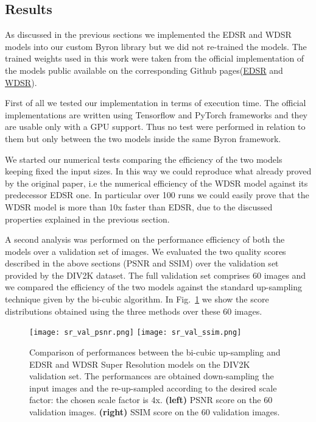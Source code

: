 \documentclass{standalone}
\begin{document}
\subsection[Results]{Results}\label{SR:results}

As discussed in the previous sections we implemented the EDSR and WDSR models into our custom \textsf{Byron} library but we did not re-trained the models.
The trained weights used in this work were taken from the official implementation of the models public available on the corresponding Github pages(\href{}{EDSR} and \href{}{WDSR}). %

First of all we tested our implementation in terms of execution time.
The official implementations are written using \textsf{Tensorflow} and \textsf{PyTorch} frameworks and they are usable only with a GPU support.
Thus no test were performed in relation to them but only between the two models inside the same \textsf{Byron} framework.

We started our numerical tests comparing the efficiency of the two models keeping fixed the input sizes.
In this way we could reproduce what already proved by the original paper, i.e the numerical efficiency of the WDSR model against its predecessor EDSR one.
In particular over 100 runs we could easily prove that the WDSR model is more than 10x faster than EDSR, due to the discussed properties explained in the previous section.

A second analysis was performed on the performance efficiency of both the models over a validation set of images.
We evaluated the two quality scores described in the above sections (PSNR and SSIM) over the validation set provided by the DIV2K dataset.
The full validation set comprises 60 images and we compared the efficiency of the two models against the standard up-sampling technique given by the bi-cubic algorithm.
In Fig.~\ref{fig:sr_validation} we show the score distributions obtained using the three methods over these 60 images.

\begin{center}
\begin{figure}[htbp]
\centering
\texttt{[image: sr\_val\_psnr.png]}
\quad
\texttt{[image: sr\_val\_ssim.png]}
\caption{Comparison of performances between the bi-cubic up-sampling and EDSR and WDSR Super Resolution models on the DIV2K validation set.
The performances are obtained down-sampling the input images and the re-up-sampled according to the desired scale factor: the chosen scale factor is 4x.
\textbf{(left)} PSNR score on the 60 validation images.
\textbf{(right)} SSIM score on the 60 validation images.
}
\label{fig:sr_validation}
\end{figure}
\end{center}
\end{document}
